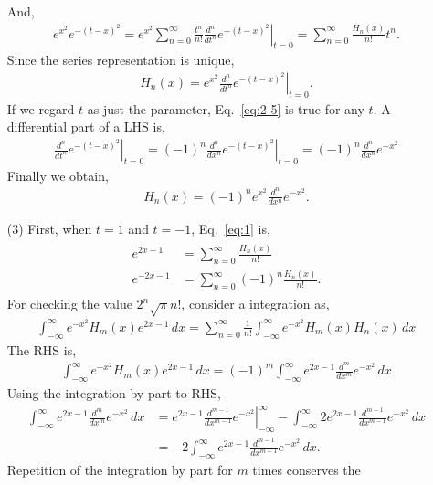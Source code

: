 \documentclass[floatfix,nofootinbib,superscriptaddress,fleqn]{revtex4-2}
\begin{document}
\begin{itemize}
And, 
\begin{align*}
  e^{x^2}e^{-(t-x)^2} = \left.e^{x^2}\sum^\infty_{n=0}\frac{t^n}{n!}
  \frac{d^n}{dt^n}e^{-(t-x)^2}\right|_{t=0} 
  = \sum^\infty_{n=0}\frac{H_n(x)}{n!}t^n.
\end{align*}
Since the series representation is unique,
\begin{align}\label{eq:2-5}
  H_n(x)=e^{x^2}\left.\frac{d^n}{dt^n}e^{-(t-x)^2}\right|_{t=0}.
\end{align}
If we regard $t$ as just the parameter, Eq.~\eqref{eq:2-5} is true for 
any $t$. 
A differential part of a LHS is,
\begin{align*}
  \left.\frac{d^n}{dt^n}e^{-(t-x)^2}\right|_{t=0}
  =\left.(-1)^n\frac{d^n}{dx^n}e^{-(t-x)^2}\right|_{t=0}
  =(-1)^n\frac{d^n}{dx^n}e^{-x^2}
\end{align*}
Finally we obtain,
\begin{align}\label{eq:2-5-1}
  H_n(x) = (-1)^ne^{x^2}\frac{d^n}{dx^n}e^{-x^2}.
\end{align}
\item[(3)]First, when $t=1$ and $t=-1$, Eq.~\eqref{eq:1} is,
\begin{align*}
  \begin{split}
    e^{2x-1}&=\sum^\infty_{n=0}\frac{H_n(x)}{n!} \\
    e^{-2x-1}&=\sum^\infty_{n=0}(-1)^n\frac{H_n(x)}{n!}.
  \end{split}
\end{align*} 
For checking the value $2^n \sqrt{\pi}n!$, consider a integration as,
\begin{align}\label{eq:2-6}
  \int_{-\infty}^{\infty}e^{-x^2}H_m(x)e^{2x-1}\,dx
  =\sum_{n=0}^\infty\frac{1}{n!}\int_{-\infty}^{\infty}
  e^{-x^2}H_m(x)H_n(x)\,dx
\end{align}
The RHS is,
\begin{align*}
  \int_{-\infty}^{\infty}e^{-x^2}H_m(x)e^{2x-1}\,dx 
  =(-1)^m\int_{-\infty}^{\infty}e^{2x-1}
  \frac{d^m}{dx^m}e^{-x^2}\,dx
\end{align*}
Using the integration by part to RHS,
\begin{align*}
    \int_{-\infty}^{\infty}e^{2x-1}\frac{d^m}{dx^m}e^{-x^2}\,dx  
    &=\left.e^{2x-1}
    \frac{d^{m-1}}{dx^{m-1}}e^{-x^2}\right|^\infty_{-\infty}
    -\int_{-\infty}^{\infty}2e^{2x-1}
    \frac{d^{m-1}}{dx^{m-1}}e^{-x^2}\,dx \\
    &=-2\int_{-\infty}^{\infty}e^{2x-1}
    \frac{d^{m-1}}{dx^{m-1}}e^{-x^2}\,dx. 
\end{align*}
Repetition of the integration by part for $m$ times conserves the 

\end{itemize}
\end{document}
